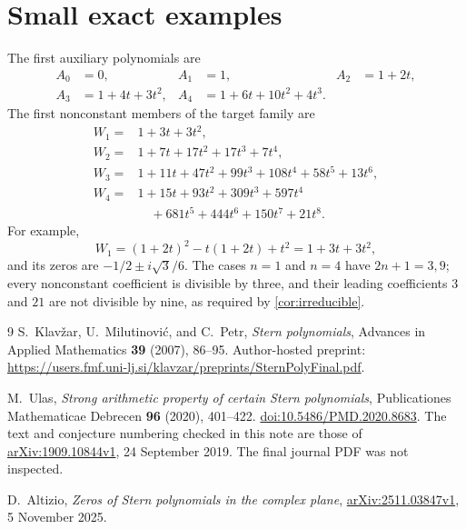 \documentclass[11pt]{article}
\numberwithin{equation}{section}
\theoremstyle{definition}
\begin{document}
\section{Small exact examples}\label{sec:examples}

The first auxiliary polynomials are
\begin{align*}
 A_0&=0,& A_1&=1,& A_2&=1+2t,\\
 A_3&=1+4t+3t^2,&
 A_4&=1+6t+10t^2+4t^3.
\end{align*}
The first nonconstant members of the target family are
\begin{align*}
 W_1={}&1+3t+3t^2,\\
 W_2={}&1+7t+17t^2+17t^3+7t^4,\\
 W_3={}&1+11t+47t^2+99t^3+108t^4+58t^5+13t^6,\\
 W_4={}&1+15t+93t^2+309t^3+597t^4\\
       &\quad+681t^5+444t^6+150t^7+21t^8.
\end{align*}
For example,
\[
 W_1=(1+2t)^2-t(1+2t)+t^2=1+3t+3t^2,
\]
and its zeros are $-1/2\pm i\sqrt3/6$.
The cases $n=1$ and $n=4$ have $2n+1=3,9$; every nonconstant coefficient
is divisible by three, and their leading coefficients $3$ and $21$ are
not divisible by nine, as required by \cref{cor:irreducible}.

\begin{thebibliography}{9}
S.~Klav\v{z}ar, U.~Milutinovi\'{c}, and C.~Petr,
\emph{Stern polynomials},
Advances in Applied Mathematics \textbf{39} (2007), 86--95.
Author-hosted preprint:
\url{https://users.fmf.uni-lj.si/klavzar/preprints/SternPolyFinal.pdf}.

M.~Ulas,
\emph{Strong arithmetic property of certain Stern polynomials},
Publicationes Mathematicae Debrecen \textbf{96} (2020), 401--422.
\href{https://doi.org/10.5486/PMD.2020.8683}{doi:10.5486/PMD.2020.8683}.
The text and conjecture numbering checked in this note are those of
\href{https://arxiv.org/abs/1909.10844v1}{arXiv:1909.10844v1},
24 September 2019.  The final journal PDF was not inspected.

D.~Altizio,
\emph{Zeros of Stern polynomials in the complex plane},
\href{https://arxiv.org/abs/2511.03847v1}{arXiv:2511.03847v1},
5 November 2025.
\end{thebibliography}
\end{document}
